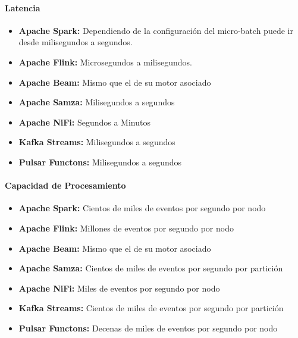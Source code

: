 \paragraph{Latencia}
\begin{itemize}
    \item \textbf{Apache Spark:} Dependiendo de la configuración del micro-batch puede ir desde milisegundos a segundos.
    \item \textbf{Apache Flink:} Microsegundos a milisegundos.
    \item \textbf{Apache Beam:} Mismo que el de su motor asociado 
    \item \textbf{Apache Samza:} Milisegundos a segundos
    \item \textbf{Apache NiFi:} Segundos a Minutos
    \item \textbf{Kafka Streams:} Milisegundos a segundos
    \item \textbf{Pulsar Functons:} Milisegundos a segundos
\end{itemize}

\paragraph{Capacidad de Procesamiento}
\begin{itemize}
    \item \textbf{Apache Spark:} Cientos de miles de eventos por segundo por nodo
    \item \textbf{Apache Flink:} Millones de eventos por segundo por nodo
    \item \textbf{Apache Beam:} Mismo que el de su motor asociado 
    \item \textbf{Apache Samza:} Cientos de miles de eventos por segundo por partición
    \item \textbf{Apache NiFi:} Miles de eventos por segundo por nodo
    \item \textbf{Kafka Streams:} Cientos de miles de eventos por segundo por partición
    \item \textbf{Pulsar Functons:} Decenas de miles de eventos por segundo por nodo
\end{itemize}
\newpage
